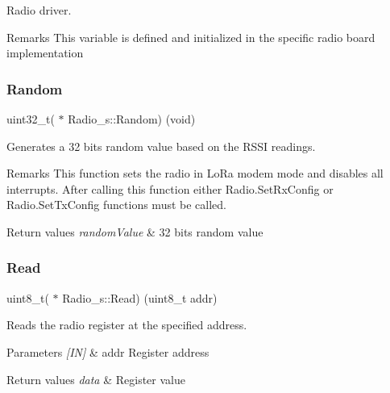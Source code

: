 Radio driver. 

\begin{DoxyRemark}{Remarks}
This variable is defined and initialized in the specific radio board implementation 
\end{DoxyRemark}
\mbox{\label{group__LORA_gaf39c7ced02721092f0f780f6632a81fd}} 
\subsubsection{\texorpdfstring{Random}{Random}}
{\footnotesize\ttfamily uint32\+\_\+t( $\ast$ Radio\+\_\+s\+::\+Random) (void)}



Generates a 32 bits random value based on the R\+S\+SI readings. 

\begin{DoxyRemark}{Remarks}
This function sets the radio in Lo\+Ra modem mode and disables all interrupts. After calling this function either Radio.\+Set\+Rx\+Config or Radio.\+Set\+Tx\+Config functions must be called.
\end{DoxyRemark}

\begin{DoxyRetVals}{Return values}
{\em random\+Value} & 32 bits random value \\
\hline
\end{DoxyRetVals}
\mbox{\label{group__LORA_ga8396bca959a0b717fabd37ac91c11534}} 
\subsubsection{\texorpdfstring{Read}{Read}}
{\footnotesize\ttfamily uint8\+\_\+t( $\ast$ Radio\+\_\+s\+::\+Read) (uint8\+\_\+t addr)}



Reads the radio register at the specified address. 


\begin{DoxyParams}{Parameters}
{\em \mbox{[}\+I\+N\mbox{]}} & addr Register address \\
\hline
\end{DoxyParams}

\begin{DoxyRetVals}{Return values}
{\em data} & Register value \\
\hline
\end{DoxyRetVals}
\mbox{\label{group__LORA_ga7ef5175264a4cf10bb6d9fa40c115dab}} 
